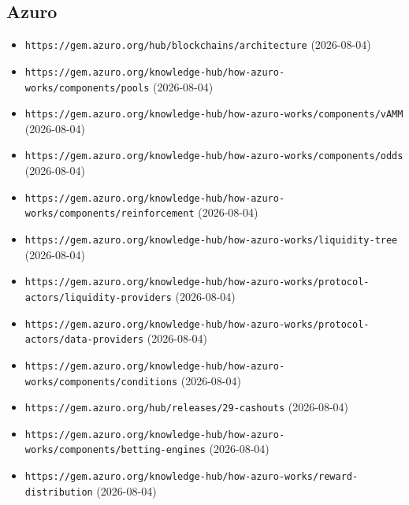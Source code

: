 \subsection*{Azuro}
\begin{itemize}\setlength{\itemsep}{0pt}\small
\item \texttt{https://gem.azuro.org/hub/blockchains/architecture} (2026-08-04)
\item \texttt{https://gem.azuro.org/knowledge-hub/how-azuro-works/components/pools} (2026-08-04)
\item \texttt{https://gem.azuro.org/knowledge-hub/how-azuro-works/components/vAMM} (2026-08-04)
\item \texttt{https://gem.azuro.org/knowledge-hub/how-azuro-works/components/odds} (2026-08-04)
\item \texttt{https://gem.azuro.org/knowledge-hub/how-azuro-works/components/reinforcement} (2026-08-04)
\item \texttt{https://gem.azuro.org/knowledge-hub/how-azuro-works/liquidity-tree} (2026-08-04)
\item \texttt{https://gem.azuro.org/knowledge-hub/how-azuro-works/protocol-actors/liquidity-providers} (2026-08-04)
\item \texttt{https://gem.azuro.org/knowledge-hub/how-azuro-works/protocol-actors/data-providers} (2026-08-04)
\item \texttt{https://gem.azuro.org/knowledge-hub/how-azuro-works/components/conditions} (2026-08-04)
\item \texttt{https://gem.azuro.org/hub/releases/29-cashouts} (2026-08-04)
\item \texttt{https://gem.azuro.org/knowledge-hub/how-azuro-works/components/betting-engines} (2026-08-04)
\item \texttt{https://gem.azuro.org/knowledge-hub/how-azuro-works/reward-distribution} (2026-08-04)
\end{itemize}

